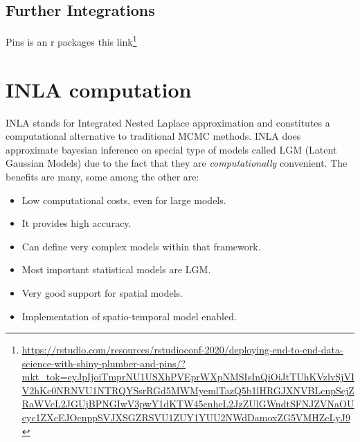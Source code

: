 \documentclass[
  12pt,
  a4paper,
  oneside]{book}
\DeclareRobustCommand{\href}[2]{#2\footnote{\url{#1}}}
\providecommand{\tightlist}{%
  \setlength{\itemsep}{0pt}\setlength{\parskip}{0pt}}
\begin{document}
\hypertarget{further-integrations}{%
\section{Further Integrations}\label{further-integrations}}

Pins is an r packages \href{https://rstudio.com/resources/rstudioconf-2020/deploying-end-to-end-data-science-with-shiny-plumber-and-pins/?mkt_tok=eyJpIjoiTmprNU1USXhPVEprWXpNMSIsInQiOiJtTUhKVzlvSjVIV2hKc0NRNVU1NTRQYSsrRGd5MWMyemlTazQ5b1lHRGJXNVBLcnpScjZRaWVcL2JGUjBPNGIwV3pwY1dKTW45cnhcL2JzZUlGWndtSFNJZVNaOUcyc1ZXcEJOcnppSVJXSGZRSVU1ZUY1YUU2NWdDamoxZG5VMHZcLyJ9}{this link}

\hypertarget{inla-spde}{%
\chapter{INLA computation}\label{inla-spde}}

INLA \citep{Rue2009} stands for Integrated Nested Laplace approximation and constitutes a computational alternative to traditional MCMC methods. INLA does approximate bayesian inference on special type of models called LGM (Latent Gaussian Models) due to the fact that they are \emph{computationally} convenient. The benefits are many, some among the other are:

\begin{itemize}
\tightlist
\item
  Low computational costs, even for large models.
\item
  It provides high accuracy.
\item
  Can define very complex models within that framework.
\item
  Most important statistical models are LGM.
\item
  Very good support for spatial models.
\item
  Implementation of spatio-temporal model enabled.
\end{itemize}
\end{document}
